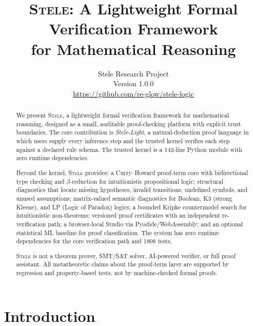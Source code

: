 \documentclass[11pt,a4paper]{article}
\theoremstyle{definition}
\theoremstyle{plain}
\newcommand{\stele}{\textsc{Stele}}
\begin{document}

\title{\stele: A Lightweight Formal Verification Framework \\
  for Mathematical Reasoning}
\author{Stele Research Project \\[4pt]
  \small Version 1.0.0 \\
  \small \url{https://github.com/re-glow/stele-logic}}
\date{}
\maketitle

\begin{abstract}
We present \stele, a lightweight formal verification framework for
mathematical reasoning, designed as a small, auditable proof-checking
platform with explicit trust boundaries.
The core contribution is \emph{Stele-Light}, a natural-deduction
proof language in which users supply every inference step and the
trusted kernel verifies each step against a declared rule schema.
The trusted kernel is a 142-line Python module with zero runtime
dependencies.

Beyond the kernel, \stele{} provides: a Curry--Howard proof-term
core with bidirectional type checking and $\beta$-reduction for
intuitionistic propositional logic; structural diagnostics that
locate missing hypotheses, invalid transitions, undefined symbols,
and unused assumptions; matrix-valued semantic diagnostics for
Boolean, K3 (strong Kleene), and LP (Logic of Paradox) logics;
a bounded Kripke countermodel search for intuitionistic non-theorems;
versioned proof certificates with an independent re-verification
path; a browser-local Studio via Pyodide/WebAssembly; and an
optional statistical ML baseline for proof classification.
The system has zero runtime dependencies for the core verification
path and 1808 tests.

\stele{} is not a theorem prover, SMT/SAT solver, AI-powered
verifier, or full proof assistant.
All metatheoretic claims about the proof-term layer are supported
by regression and property-based tests, not by machine-checked
formal proofs.
\end{abstract}

\section{Introduction}
\label{sec:intro}
\end{document}
